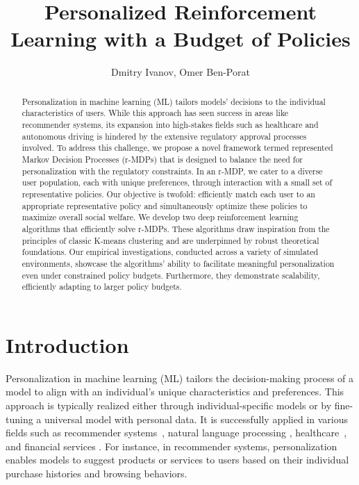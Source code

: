 \documentclass[letterpaper]{article} %
\title{Personalized Reinforcement Learning with a Budget of Policies}
\author{
    Dmitry Ivanov,
    Omer Ben-Porat
}
\begin{document}
\maketitle


\begin{abstract}
Personalization in machine learning (ML) tailors models' decisions to the individual characteristics of users. While this approach has seen success in areas like recommender systems, its expansion into high-stakes fields such as healthcare and autonomous driving is hindered by the extensive regulatory approval processes involved. To address this challenge, we propose a novel framework termed represented Markov Decision Processes (r-MDPs) that is designed to balance the need for personalization with the regulatory constraints. In an r-MDP, we cater to a diverse user population, each with unique preferences, through interaction with a small set of representative policies. Our objective is twofold: efficiently match each user to an appropriate representative policy and simultaneously optimize these policies to maximize overall social welfare. We develop two deep reinforcement learning algorithms that efficiently solve r-MDPs. These algorithms draw inspiration from the principles of classic K-means clustering and are underpinned by robust theoretical foundations. Our empirical investigations, conducted across a variety of simulated environments, showcase the algorithms' ability to facilitate meaningful personalization even under constrained policy budgets. Furthermore, they demonstrate scalability, efficiently adapting to larger policy budgets.
\end{abstract}

\section{Introduction}
\label{sec:introduction}

Personalization in machine learning (ML) tailors the decision-making process of a model to align with an individual's unique characteristics and preferences. This approach is typically realized either through individual-specific models or by fine-tuning a universal model with personal data. It is successfully applied in various fields such as recommender systems~\cite{shepitsen2008personalized,lee2012prea,yao2020rlper}, natural language processing \cite{wu2023personalized}, healthcare~\cite{ayer2012or}, and financial services \cite{capponi2022personalized}. For instance, in recommender systems, personalization enables models to suggest products or services to users based on their individual purchase histories and browsing behaviors.
\end{document}
